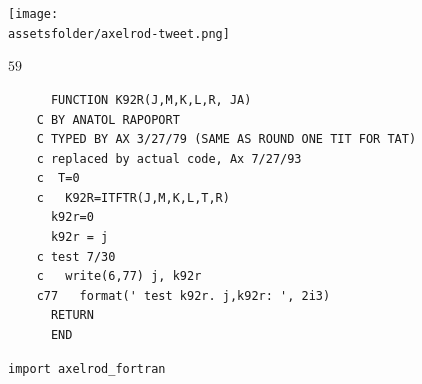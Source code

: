\documentclass{beamer}
\newcommand{\assetsfolder}{./assets}
\begin{document}
    \begin{frame}
        \begin{center}
            \texttt{[image: \\assetsfolder/axelrod-tweet.png]}
        \end{center}

    \end{frame}

    \begin{frame}
        \begin{center}
            \fontsize{60}{70}\selectfont \(59\)
        \end{center}
    \end{frame}

\begin{frame}[fragile]{}
    \begin{verbatim}
      FUNCTION K92R(J,M,K,L,R, JA)
    C BY ANATOL RAPOPORT
    C TYPED BY AX 3/27/79 (SAME AS ROUND ONE TIT FOR TAT)
    c replaced by actual code, Ax 7/27/93
    c  T=0
    c   K92R=ITFTR(J,M,K,L,T,R)
      k92r=0
      k92r = j
    c test 7/30
    c   write(6,77) j, k92r
    c77   format(' test k92r. j,k92r: ', 2i3)
      RETURN
      END
        \end{verbatim}

\end{frame}

\begin{frame}[fragile]{}

    \begin{center}
        \begin{minipage}{0.8\textwidth}
            \begin{verbatim}
import axelrod_fortran
            \end{verbatim}
        \end{minipage}
    \end{center}

\end{frame}
\end{document}
